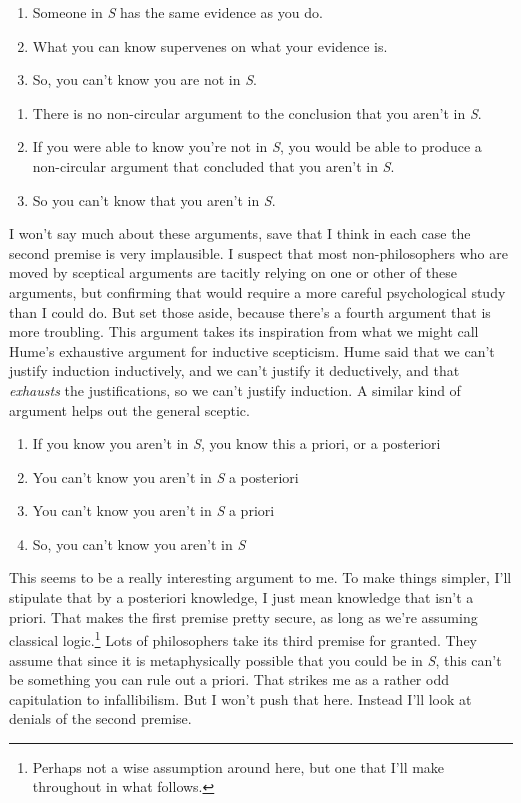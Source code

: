 \documentclass[
  11pt,
  letterpaper,
  DIV=11,
  numbers=noendperiod,
  oneside]{scrartcl}
\begin{document}
\begin{enumerate}
\def\labelenumi{\arabic{enumi}.}
\item
  Someone in \emph{S} has the same evidence as you do.
\item
  What you can know supervenes on what your evidence is.
\item
  So, you can't know you are not in \emph{S}.
\end{enumerate}

\begin{enumerate}
\def\labelenumi{\arabic{enumi}.}
\item
  There is no non-circular argument to the conclusion that you aren't in
  \emph{S}.
\item
  If you were able to know you're not in \emph{S}, you would be able to
  produce a non-circular argument that concluded that you aren't in
  \emph{S}.
\item
  So you can't know that you aren't in \emph{S}.
\end{enumerate}

I won't say much about these arguments, save that I think in each case
the second premise is very implausible. I suspect that most
non-philosophers who are moved by sceptical arguments are tacitly
relying on one or other of these arguments, but confirming that would
require a more careful psychological study than I could do. But set
those aside, because there's a fourth argument that is more troubling.
This argument takes its inspiration from what we might call Hume's
exhaustive argument for inductive scepticism. Hume said that we can't
justify induction inductively, and we can't justify it deductively, and
that \emph{exhausts} the justifications, so we can't justify induction.
A similar kind of argument helps out the general sceptic.

\begin{enumerate}
\def\labelenumi{\arabic{enumi}.}
\item
  If you know you aren't in \emph{S}, you know this a priori, or a
  posteriori
\item
  You can't know you aren't in \emph{S} a posteriori
\item
  You can't know you aren't in \emph{S} a priori
\item
  So, you can't know you aren't in \emph{S}
\end{enumerate}

This seems to be a really interesting argument to me. To make things
simpler, I'll stipulate that by a posteriori knowledge, I just mean
knowledge that isn't a priori. That makes the first premise pretty
secure, as long as we're assuming classical logic.\footnote{Perhaps not
  a wise assumption around here, but one that I'll make throughout in
  what follows.} Lots of philosophers take its third premise for
granted. They assume that since it is metaphysically possible that you
could be in \emph{S}, this can't be something you can rule out a priori.
That strikes me as a rather odd capitulation to infallibilism. But I
won't push that here. Instead I'll look at denials of the second
premise.
\end{document}
